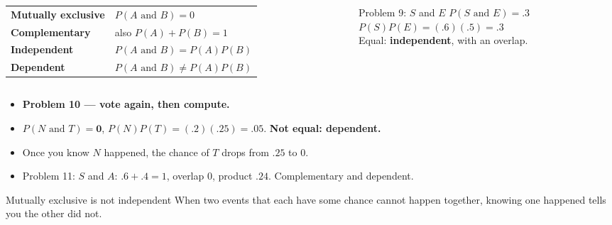 \documentclass[aspectratio=169, 11pt]{beamer}
\newcommand{\redink}[1]{{\color{redacc}\bfseries #1}}
\begin{document}
\begin{frame}[t, plain]
  \begin{columns}[t]
    \begin{column}{0.55\textwidth}
      \small
      \renewcommand{\arraystretch}{1.35}
      \begin{tabular}{@{} l l @{}}
      \textbf{Mutually exclusive} & $P(A \text{ and } B) = 0$ \\
      \textbf{Complementary} & also $P(A) + P(B) = 1$ \\
      \textbf{Independent} & $P(A \text{ and } B) = P(A)P(B)$ \\
      \textbf{Dependent} & $P(A \text{ and } B) \neq P(A)P(B)$ \\
      \end{tabular}
    \end{column}
    \begin{column}{0.41\textwidth}
      \begin{block}{Problem 9: $S$ and $E$}
        $P(S \text{ and } E) = .3$\\
        $P(S)P(E) = (.6)(.5) = .3$\\
        Equal: \redink{independent}, with an overlap.
      \end{block}
    \end{column}
  \end{columns}
\end{frame}

\begin{frame}[t, plain]
  \vspace{4pt}
  \begin{itemize}\setlength{\itemsep}{5pt}
    \item \textbf{Problem 10 --- vote again, then compute.}
    \item $P(N \text{ and } T) = \mathbf{0}$, \quad $P(N)P(T) = (.2)(.25) = \mathbf{.05}$.
          \redink{Not equal: dependent.}
    \item Once you know $N$ happened, the chance of $T$ drops from $.25$ to $0$.
    \item Problem 11: $S$ and $A$: $.6 + .4 = 1$, overlap $0$, product $.24$. Complementary and
          dependent.
  \end{itemize}
  \begin{block}{Mutually exclusive is not independent}
    When two events that each have some chance cannot happen together, knowing one happened
    tells you the other did not.
  \end{block}
\end{frame}
\end{document}
